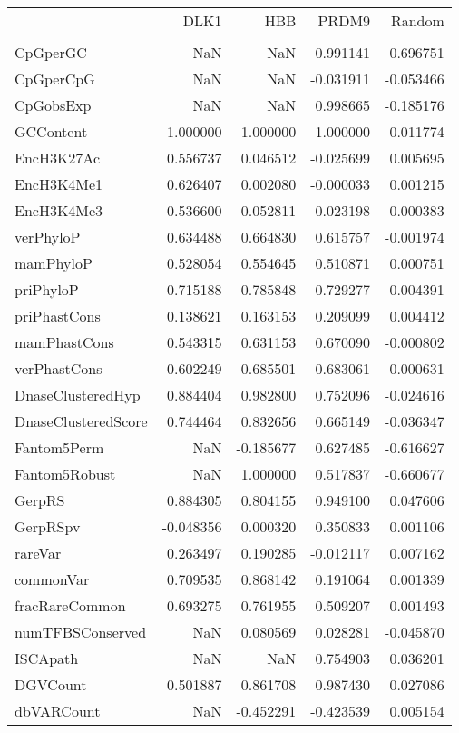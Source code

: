 \begin{tabular}{lrrrr}
\toprule
{} &      DLK1 &       HBB &     PRDM9 &    Random \\
                    &           &           &           &           \\
\midrule
CpGperGC            &       NaN &       NaN &  0.991141 &  0.696751 \\
CpGperCpG           &       NaN &       NaN & -0.031911 & -0.053466 \\
CpGobsExp           &       NaN &       NaN &  0.998665 & -0.185176 \\
GCContent           &  1.000000 &  1.000000 &  1.000000 &  0.011774 \\
EncH3K27Ac          &  0.556737 &  0.046512 & -0.025699 &  0.005695 \\
EncH3K4Me1          &  0.626407 &  0.002080 & -0.000033 &  0.001215 \\
EncH3K4Me3          &  0.536600 &  0.052811 & -0.023198 &  0.000383 \\
verPhyloP           &  0.634488 &  0.664830 &  0.615757 & -0.001974 \\
mamPhyloP           &  0.528054 &  0.554645 &  0.510871 &  0.000751 \\
priPhyloP           &  0.715188 &  0.785848 &  0.729277 &  0.004391 \\
priPhastCons        &  0.138621 &  0.163153 &  0.209099 &  0.004412 \\
mamPhastCons        &  0.543315 &  0.631153 &  0.670090 & -0.000802 \\
verPhastCons        &  0.602249 &  0.685501 &  0.683061 &  0.000631 \\
DnaseClusteredHyp   &  0.884404 &  0.982800 &  0.752096 & -0.024616 \\
DnaseClusteredScore &  0.744464 &  0.832656 &  0.665149 & -0.036347 \\
Fantom5Perm         &       NaN & -0.185677 &  0.627485 & -0.616627 \\
Fantom5Robust       &       NaN &  1.000000 &  0.517837 & -0.660677 \\
GerpRS              &  0.884305 &  0.804155 &  0.949100 &  0.047606 \\
GerpRSpv            & -0.048356 &  0.000320 &  0.350833 &  0.001106 \\
rareVar             &  0.263497 &  0.190285 & -0.012117 &  0.007162 \\
commonVar           &  0.709535 &  0.868142 &  0.191064 &  0.001339 \\
fracRareCommon      &  0.693275 &  0.761955 &  0.509207 &  0.001493 \\
numTFBSConserved    &       NaN &  0.080569 &  0.028281 & -0.045870 \\
ISCApath            &       NaN &       NaN &  0.754903 &  0.036201 \\
DGVCount            &  0.501887 &  0.861708 &  0.987430 &  0.027086 \\
dbVARCount          &       NaN & -0.452291 & -0.423539 &  0.005154 \\
\bottomrule
\end{tabular}
